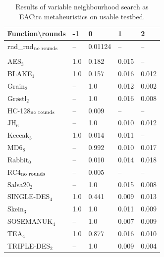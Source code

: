 \documentclass[
  print, %
  Table,   %
  nolof,     %
  nolot,     %
  11pt, %
  oneside  %
]{fithesis3}
\newcommand{\fd}{\cellcolor{myred!15}}
\newcommand{\fn}{\cellcolor{mygreen!20}}
\begin{document}
\begin{table}[H]
\centering
\begin{tabular}{l|l l l l}
Function\textbackslash{}rounds & -1 & 0 & 1 & 2\\ \hline
rnd\_rnd$_{\textnormal{no rounds}}$ & -- & \fn{}0.01124 & -- & --   \\\\
AES$_{3}$        & \fd{}1.0   & \fd{}0.182 & \fn{}0.015 & \fn{}--   \\
BLAKE$_{1}$      & \fd{}1.0   & \fd{}0.157 & \fn{}0.016 & \fn{}0.012\\
Grain$_{2}$      & \fd{}--    & \fd{}1.0   & \fn{}0.012 & \fn{}0.002\\
Gr\o stl$_{2}$   & \fd{}--    & \fd{}1.0   & \fn{}0.016 & \fn{}0.008\\
HC-128$_{\textnormal{no rounds}}$& -- & \fn{}0.009 & -- & --        \\
JH$_{6}$         & \fd{}--    & \fd{}1.0   & \fn{}0.010 & \fn{}0.012\\
Keccak$_{3}$     & \fd{}1.0   & \fn{}0.014 & \fn{}0.011 & \fn{}--   \\
MD6$_{8}$        & \fd{}--    & \fd{}0.992 & \fn{}0.010 & \fn{}0.017\\
Rabbit$_{0}$     &      --    & \fn{}0.010 & \fn{}0.014 & \fn{}0.018\\
RC4$_{\textnormal{no rounds}}$& -- & \fn{}0.005 & --    & --        \\
Salsa20$_{2}$    & \fd{}--    & \fd{}1.0   & \fn{}0.015 & \fn{}0.008\\
SINGLE-DES$_{4}$ & \fd{}1.0   & \fd{}0.441 & \fn{}0.009 & \fn{}0.013\\
Skein$_{3}$      & \fd{}1.0   & \fd{}1.0   & \fn{}0.011 & \fn{}0.009\\
SOSEMANUK$_{4}$  & \fd{}--    & \fd{}1.0   & \fn{}0.007 & \fn{}0.009\\
TEA$_{4}$        & \fd{}1.0   & \fd{}0.877 & \fn{}0.016 & \fn{}0.010\\
TRIPLE-DES$_{2}$ & \fd{}--    & \fd{}1.0   & \fn{}0.009 & \fn{}0.004
\end{tabular}
\caption{Results of variable neighbourhood search as EACirc metaheuristics on usable testbed.}
\label{table:res-usable-vns}
\end{table}
\end{document}
